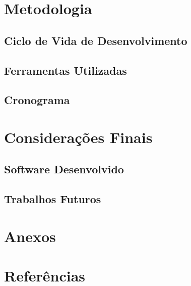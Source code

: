 \chapter[Metodologia]{Metodologia}

  \section[Ciclo de Vida de Desenvolvimento]{Ciclo de Vida de Desenvolvimento}
  \section[Ferramentas Utilizadas]{Ferramentas Utilizadas}
  \section[Cronograma]{Cronograma}

\chapter[Considerações Finais]{Considerações Finais}

  \section[Software Desenvolvido]{Software Desenvolvido}
  \section[Trabalhos Futuros]{Trabalhos Futuros}


  \chapter[Anexos]{Anexos}
  \chapter[Referências]{Referências}
